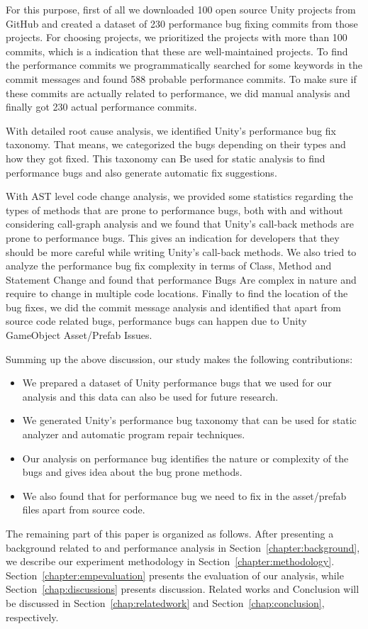 For this purpose, first of all we downloaded 100 open source Unity projects from GitHub and created a dataset of 230 performance bug fixing commits from those projects. For choosing projects, we prioritized the projects with more than 100 commits, which is a indication that these are well-maintained projects. To find the performance commits we programmatically searched for some keywords in the commit messages and found 588 probable performance commits. To make sure if these commits are actually related to performance, we did manual analysis and finally got 230 actual performance commits.

With detailed root cause analysis, we identified Unity's performance bug fix taxonomy. That means, we categorized the bugs depending on their types and how they got fixed. This taxonomy can Be used for static analysis to find performance bugs and also generate automatic fix suggestions.

With AST level code change analysis, we provided some statistics regarding the types of methods that are prone to performance bugs, both with and without considering call-graph analysis and we found that Unity's call-back methods are prone to performance bugs. This gives an indication for developers that they should be more careful while writing Unity's call-back methods. We also tried to analyze the performance bug fix complexity in terms of Class, Method and Statement Change and found that performance Bugs Are complex in nature and require to change in multiple code locations. Finally to find the location of the bug fixes, we did the commit message analysis and identified that apart from source code related bugs, performance bugs can happen due to Unity GameObject Asset/Prefab Issues.

Summing up the above discussion, our study makes the following contributions:
\begin{itemize}
	\item We prepared a dataset of Unity performance bugs that we used for our analysis and this data can also be used for future research. 
	\item We generated Unity's performance bug taxonomy that can be used for static analyzer and automatic program repair techniques.
	\item Our analysis on performance bug identifies the nature or complexity of the bugs and gives idea about the bug prone methods.
	\item We also found that for performance bug we need to fix in the asset/prefab files apart from source code. 
\end{itemize}

The remaining part of this paper is organized as follows. After presenting a background related to \unity and performance analysis in Section~\ref{chapter:background}, we describe our experiment methodology in Section~\ref{chapter:methodology}. Section~\ref{chapter:empevaluation} presents the evaluation of our analysis, while Section~\ref{chap:discussions} presents discussion. Related works and Conclusion will be discussed in Section~\ref{chap:relatedwork} and Section~\ref{chap:conclusion}, respectively.